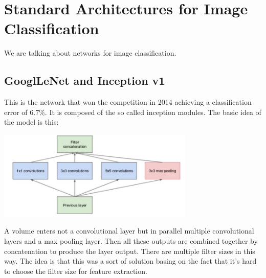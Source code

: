 \section{Standard Architectures for Image Classification}
We are talking about networks for image classification. 
\subsection{GooglLeNet and Inception v1}
This is the network that won the competition in 2014 achieving a classification error of 6.7\%.
It is composed of the so called inception modules. The basic idea of the model is this:
\begin{center}
    \includegraphics[width=0.7\textwidth]{images/googlenet.PNG}\par
\end{center}
A volume enters not a convolutional layer but in parallel multiple convolutional layers and a max pooling layer. Then all these outputs are combined together by concatenation to produce the layer output. There are multiple filter sizes in this way. The idea is that this was a sort of solution basing on the fact that it's hard to choose the filter size for feature extraction. 

